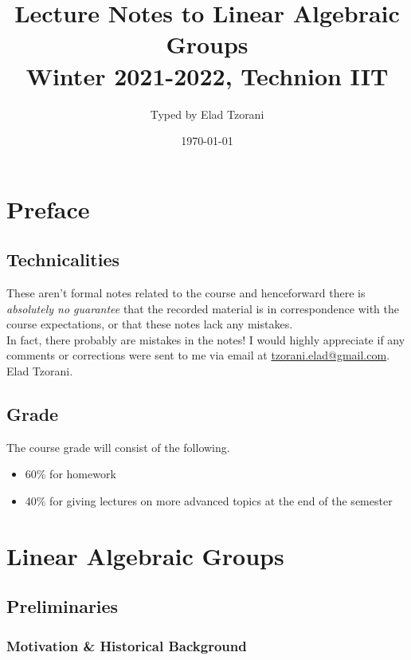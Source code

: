 \documentclass[10pt,a4paper,twoside,openany,hidelinks]{book}
\title{Lecture Notes to Linear Algebraic Groups \\ \large{Winter 2021-2022, Technion IIT}}
\author{Typed by Elad Tzorani}
\date{\today}
\begin{document}
\frontmatter
{}
\tableofcontents
\countlectures
\newpage

\chapter*{Preface}
 

\section*{Technicalities}

These aren't formal notes related to the course and henceforward there is \emph{absolutely no guarantee} that the recorded material is in correspondence with the course expectations, or that these notes lack any mistakes.\\
In fact, there probably are mistakes in the notes! I would highly appreciate if any comments or corrections were sent to me via email at \href{mailto:tzorani.elad@gmail.com}{tzorani.elad@gmail.com}.\\
Elad Tzorani.

\section*{Grade}

The course grade will consist of the following.

\begin{itemize}
\item 60\% for homework
\item 40\% for giving lectures on more advanced topics at the end of the semester
\end{itemize}

\mainmatter

\chapter{Linear Algebraic Groups}

\section{Preliminaries}

\subsection{Motivation \& Historical Background}
\end{document}
